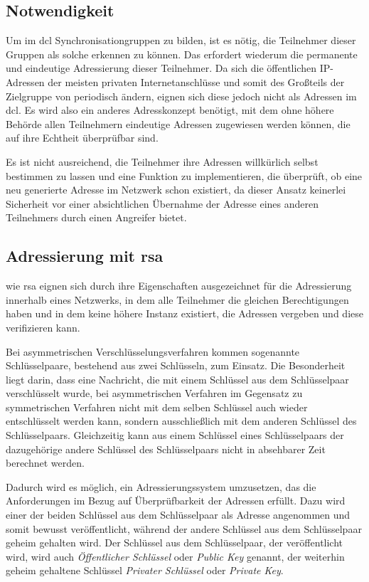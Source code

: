 
\subsection{Notwendigkeit}
Um im \gls{dcl} Synchronisationgruppen zu bilden, ist es nötig, die Teilnehmer dieser Gruppen als solche
erkennen zu können. Das erfordert wiederum die permanente und eindeutige Adressierung dieser Teilnehmer.
Da sich die öffentlichen IP-Adressen der meisten privaten Internetanschlüsse und somit des Großteils der
Zielgruppe von \sblit periodisch ändern, eignen sich diese jedoch nicht als Adressen im \gls{dcl}. Es
wird also ein anderes Adresskonzept benötigt, mit dem ohne höhere Behörde allen Teilnehmern eindeutige
Adressen zugewiesen werden können, die auf ihre Echtheit überprüfbar sind.

Es ist nicht ausreichend, die Teilnehmer ihre Adressen willkürlich selbst bestimmen zu lassen und eine
Funktion zu implementieren, die überprüft, ob eine neu generierte Adresse im Netzwerk schon existiert,
da dieser Ansatz keinerlei Sicherheit vor einer absichtlichen Übernahme der Adresse eines anderen
Teilnehmers durch einen Angreifer bietet.


\subsection{Adressierung mit \gls{rsa}}
 wie \gls{rsa} eignen sich durch ihre Eigenschaften
ausgezeichnet für die Adressierung innerhalb eines Netzwerks, in dem alle Teilnehmer die gleichen
Berechtigungen haben und in dem keine höhere Instanz existiert, die Adressen vergeben und diese
verifizieren kann.

Bei asymmetrischen Verschlüsselungsverfahren kommen sogenannte Schlüsselpaare, bestehend aus zwei
Schlüsseln, zum Einsatz. Die Besonderheit liegt darin, dass eine Nachricht, die mit einem Schlüssel
aus dem Schlüsselpaar verschlüsselt wurde, bei asymmetrischen Verfahren im Gegensatz zu symmetrischen
Verfahren nicht mit dem selben Schlüssel auch wieder entschlüsselt werden kann, sondern ausschließlich
mit dem anderen Schlüssel des Schlüsselpaars.
Gleichzeitig kann aus einem Schlüssel eines Schlüsselpaars der dazugehörige andere Schlüssel des
Schlüsselpaars nicht in absehbarer Zeit berechnet werden.

Dadurch wird es möglich, ein Adressierungssystem umzusetzen, das die Anforderungen im Bezug auf
Überprüfbarkeit der Adressen erfüllt. Dazu wird einer der beiden Schlüssel aus dem Schlüsselpaar
als Adresse angenommen und somit bewusst veröffentlicht, während der andere Schlüssel aus dem
Schlüsselpaar geheim gehalten wird.
Der Schlüssel aus dem Schlüsselpaar, der veröffentlicht wird, wird auch \emph{Öffentlicher Schlüssel}
oder \emph{Public Key} genannt, der weiterhin geheim gehaltene Schlüssel \emph{Privater Schlüssel} oder
\emph{Private Key}.

